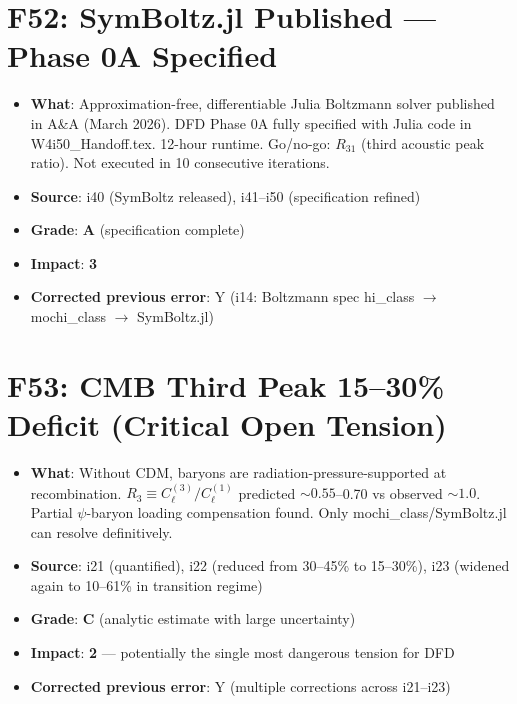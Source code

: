 \documentclass[11pt,a4paper]{article}
\newcommand{\grade}[1]{\textbf{#1}}
\newcommand{\impact}[1]{\textbf{#1}}
\begin{document}
\section{F52: SymBoltz.jl Published --- Phase 0A Specified}
\begin{itemize}[nosep]
\item \textbf{What}: Approximation-free, differentiable Julia Boltzmann solver published in A\&A (March 2026). DFD Phase 0A fully specified with Julia code in W4i50\_Handoff.tex. 12-hour runtime. Go/no-go: $R_{31}$ (third acoustic peak ratio). Not executed in 10 consecutive iterations.
\item \textbf{Source}: i40 (SymBoltz released), i41--i50 (specification refined)
\item \textbf{Grade}: \grade{A} (specification complete)
\item \textbf{Impact}: \impact{3}
\item \textbf{Corrected previous error}: Y (i14: Boltzmann spec hi\_class $\to$ mochi\_class $\to$ SymBoltz.jl)
\end{itemize}

\section{F53: CMB Third Peak 15--30\% Deficit (Critical Open Tension)}
\begin{itemize}[nosep]
\item \textbf{What}: Without CDM, baryons are radiation-pressure-supported at recombination. $R_3 \equiv C_\ell^{(3)}/C_\ell^{(1)}$ predicted $\sim 0.55$--0.70 vs observed $\sim 1.0$. Partial $\psi$-baryon loading compensation found. Only mochi\_class/SymBoltz.jl can resolve definitively.
\item \textbf{Source}: i21 (quantified), i22 (reduced from 30--45\% to 15--30\%), i23 (widened again to 10--61\% in transition regime)
\item \textbf{Grade}: \grade{C} (analytic estimate with large uncertainty)
\item \textbf{Impact}: \impact{2} --- potentially the single most dangerous tension for DFD
\item \textbf{Corrected previous error}: Y (multiple corrections across i21--i23)
\end{itemize}
\end{document}
